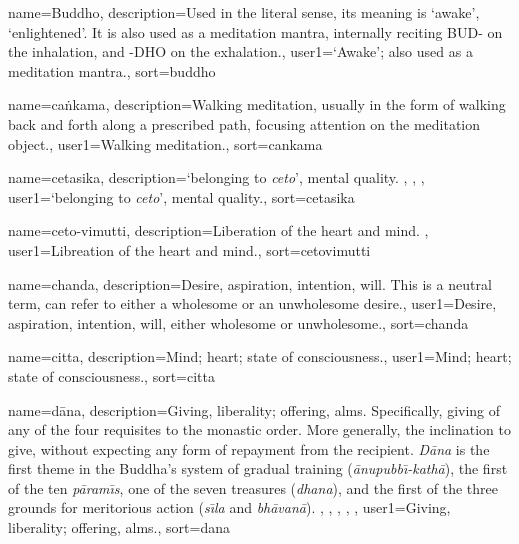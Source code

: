 {
name={Buddho},
description={Used in the literal sense, its meaning is `awake', `enlightened'. It is also used as a meditation mantra, internally reciting BUD- on the inhalation, and -DHO on the exhalation.},
user1={`Awake'; also used as a meditation mantra.},
sort={buddho}
}

{
name={ca\.nkama},
description={Walking meditation, usually in the form of walking back and forth along a prescribed path, focusing attention on the meditation object.},
user1={Walking meditation.},
sort={cankama}
}

{
name={cetasika},
description={`belonging to \textit{ceto}', mental quality. \protect \seepre %
\protect {}, \protect {}, \protect {}%
\protect \seepost %
},
user1={`belonging to \textit{ceto}', mental quality.},
sort={cetasika}
}

{
name={ceto-vimutti},
description={Liberation of the heart and mind. \protect \seepre %
\protect {}%
\protect \seepost %
},
user1={Libreation of the heart and mind.},
sort={cetovimutti}
}

{
name=chanda,
description={Desire, aspiration, intention, will. This is a neutral term, can refer to either a wholesome or an unwholesome desire.},
user1={Desire, aspiration, intention, will, either wholesome or unwholesome.},
sort={chanda}
}

{
name={citta},
description={Mind; heart; state of consciousness.},
user1={Mind; heart; state of consciousness.},
sort={citta}
}

{
name={d\=ana},
description={Giving, liberality; offering, alms. Specifically, giving of any of the four requisites to the monastic order. More generally, the inclination to give, without expecting any form of repayment from the recipient. \textit{D\=ana} is the first theme in the Buddha's system of gradual training (\textit{\=anupubb\={\i}-kath\=a}), the first of the ten \textit{p\=aram\={\i}s}, one of the seven treasures (\textit{dhana}), and the first of the three grounds for meritorious action (\textit{s\={\i}la} and \textit{bh\=avan\=a}). \protect \seepre %
\protect {}, \protect {}, \protect {}, \protect {}, \protect {}%
\protect \seepost %
},
user1={Giving, liberality; offering, alms.},
sort={dana}
}


